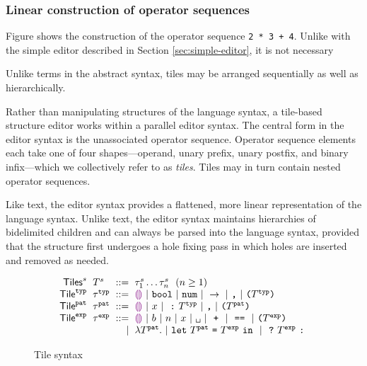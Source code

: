 \subsubsection{Linear construction of operator sequences}
Figure  shows the construction of the operator
sequence \texttt{2 * 3 + 4}. Unlike with the simple editor described
in Section \ref{sec:simple-editor}, it is not necessary

Unlike terms in the abstract syntax, tiles may be arranged
sequentially as well as hierarchically.

Rather than manipulating structures of the language syntax,
a tile-based structure editor works within a parallel editor syntax.
The central form in the editor syntax is the unassociated operator
sequence. Operator sequence elements each take one of four shapes---operand,
unary prefix, unary postfix, and
binary infix---which we collectively refer to as \emph{tiles}.
Tiles may in turn contain nested operator sequences.

Like text, the editor syntax provides a flattened, more linear representation
of the language syntax.
Unlike text, the editor syntax maintains hierarchies of
bidelimited children and can always be parsed into the
language syntax, provided that the structure first undergoes
a hole fixing pass in which holes are inserted and removed
as needed.


\begin{figure}
  \vspace{-3px}
  \[
  \arraycolsep=3pt\begin{array}{rlrl}
      \mathsf{Tiles}^s & \tiles^s & ::= & \tile^s_1\dots\tile^s_n\ \ \text{($n \geq 1$)} \\
      \mathsf{Tile}^{\typ} & \tile^{\typ} & ::= &
          \shole ~\vert~
          \sbool ~\vert~
          \snum ~\vert~
          \sarr{}{} ~\vert~
          \sprod{}{} ~\vert~
          \sparen{\tiles^{\typ}}\\
      \mathsf{Tile}^{\pat} & \tile^{\pat} & ::= &
        \shole ~\vert~
        \svar{x} ~\vert~
        \sann{}{\tiles^{\typ}} ~\vert~
        \sprod{}{} ~\vert~
        \sparen{\tiles^{\pat}}\\
      \mathsf{Tile}^{\expr} & \tile^{\expr} & ::= &
        \shole ~\vert~
        \sboollit{b} ~\vert~
        \snumlit{n} ~\vert~
        \svar{x} ~\vert~
        \sap{}{} ~\vert~
        \splus{}{} ~\vert~
        \sequals{}{} ~\vert~
        \sparen{\tiles^{\expr}} \\
      & & \vert &
        \slam{\tiles^{\pat}}{} ~\vert~
        \slet{\tiles^{\pat}}{\tiles^{\expr}}{} ~\vert~
        \scond{}{\tiles^{\expr}}{}
  \end{array}\]
  \caption{
    Tile syntax 
  }
  \label{fig:tile-syntax}
\end{figure}



